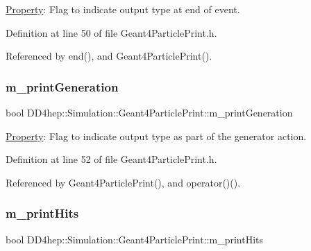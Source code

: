 \hyperlink{class_d_d4hep_1_1_property}{Property}\+: Flag to indicate output type at end of event. 



Definition at line 50 of file Geant4\+Particle\+Print.\+h.



Referenced by end(), and Geant4\+Particle\+Print().

\hypertarget{class_d_d4hep_1_1_simulation_1_1_geant4_particle_print_aa9e8a756d0ffc2d753d32941780d8f99}{}\label{class_d_d4hep_1_1_simulation_1_1_geant4_particle_print_aa9e8a756d0ffc2d753d32941780d8f99} 
\subsubsection{\texorpdfstring{m\+\_\+print\+Generation}{m\_printGeneration}}
{\footnotesize\ttfamily bool D\+D4hep\+::\+Simulation\+::\+Geant4\+Particle\+Print\+::m\+\_\+print\+Generation\hspace{0.3cm}{\ttfamily [protected]}}



\hyperlink{class_d_d4hep_1_1_property}{Property}\+: Flag to indicate output type as part of the generator action. 



Definition at line 52 of file Geant4\+Particle\+Print.\+h.



Referenced by Geant4\+Particle\+Print(), and operator()().

\hypertarget{class_d_d4hep_1_1_simulation_1_1_geant4_particle_print_ab411968553cdfbc30a79a385c0fa25c4}{}\label{class_d_d4hep_1_1_simulation_1_1_geant4_particle_print_ab411968553cdfbc30a79a385c0fa25c4} 
\subsubsection{\texorpdfstring{m\+\_\+print\+Hits}{m\_printHits}}
{\footnotesize\ttfamily bool D\+D4hep\+::\+Simulation\+::\+Geant4\+Particle\+Print\+::m\+\_\+print\+Hits\hspace{0.3cm}{\ttfamily [protected]}}



